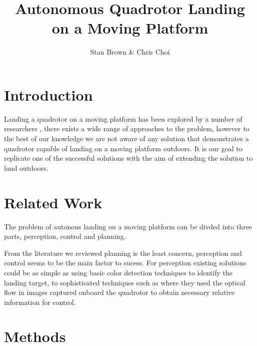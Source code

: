 \documentclass{article}
\begin{document}
\title{Autonomous Quadrotor Landing on a Moving Platform}
\author{Stan Brown \& Chris Choi}
\maketitle



\section*{Introduction}
Landing a quadrotor on a moving platform has been explored by a number of researchers \cite{Lee2012, Kim2014, Voos2010, Friis2009, Ling2014, Herisse2012}, there exists a wide range of approaches to the problem, however to the best of our knowledge we are not aware of any solution that demonstrates a quadrotor capable of landing on a moving platform outdoors. It is our goal to replicate one of the successful solutions with the aim of extending the solution to land outdoors.


\section*{Related Work} 
The problem of autonous landing on a moving platform can be divded into three parts, perception, control and planning.

From the literature we reviewed planning is the least concern, perception and control seems to be the main factor to sucess. For perception existing solutions could be as simple as using basic color detection techniques to identify the landing target\cite{Kim2014}, to sophisticated techniques such as \cite{Herisse2012} where they used the optical flow in images captured onboard the quadrotor to obtain necessary relative information for control.

\section*{Methods}
\end{document}

